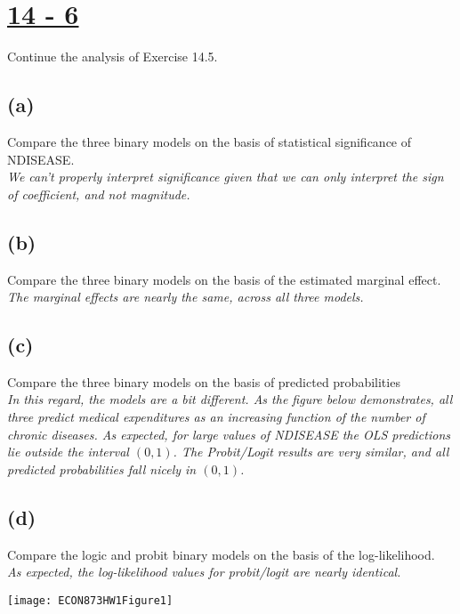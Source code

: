 \documentclass[11pt]{article}
\theoremstyle{definition}
\begin{document}
\section*{\underline{14 - 6}} 
Continue the analysis of Exercise 14.5.
\subsection*{(a)}
Compare the three binary models on the basis of statistical significance of NDISEASE. \\
\textit{We can't properly interpret significance given that we can only interpret the sign of coefficient, and not magnitude.}
\subsection*{(b)}
Compare the three binary models on the basis of the estimated marginal effect. \\
\textit{The marginal effects are nearly the same, across all three models.}
\subsection*{(c)}
Compare the three binary models on the basis of predicted probabilities \\
\textit{In this regard, the models are a bit different.  As the figure below demonstrates, all three predict medical expenditures as an increasing function of the number of chronic diseases.  As expected, for large values of NDISEASE the OLS predictions lie outside the interval $(0,1)$.  The Probit/Logit results are very similar, and all predicted probabilities fall nicely in $(0,1)$.}
\subsection*{(d)}
Compare the logic and probit binary models on the basis of the log-likelihood. \\
\textit{As expected, the log-likelihood values for probit/logit are nearly identical.}
\begin{center}
\texttt{[image: ECON873HW1Figure1]}
\end{center}

\begin{center}

\end{center}
\end{document}
